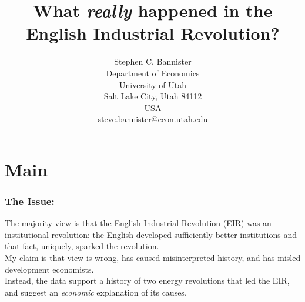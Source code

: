 \documentclass[final]{beamer}
\title{What \textit{really} happened in the English Industrial Revolution?} %
\author{Stephen C. Bannister\\
	Department of Economics\\
	University of Utah\\
	Salt Lake City, Utah 84112\\
	USA\\
	\href{mailto:steve.bannister@econ.utah.edu}{steve.bannister@econ.utah.edu}\\
	}
\date{}
\begin{document}

	\maketitle
	\nocite{*}
%	

	
%	


\section{Main}

\begin{frame}
\frametitle{The Issue:}
The majority view is that the English Industrial Revolution (EIR) was an institutional revolution: the English developed sufficiently better institutions and that fact, uniquely, sparked the revolution.\\ \pause
My claim is that view is wrong, has caused misinterpreted history, and has misled development economists.\\ \pause
Instead, the data support a history of two energy revolutions that led the EIR, and suggest an \textit{economic} explanation of its causes.\\
\end{frame}
\end{document}
